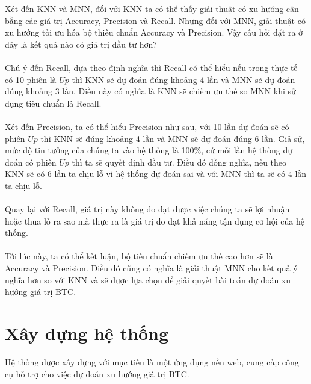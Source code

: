 Xét đến KNN và MNN, đối với KNN ta có thể thấy giải thuật có xu hướng cân bằng 
các giá trị Accuracy, Precision và Recall. Nhưng đối với MNN, giải thuật có xu 
hướng tối ưu hóa bộ thiêu chuẩn Accuracy và Precision. Vậy câu hỏi đặt ra ở đây 
là kết quả nào có giá trị đầu tư hơn?\\\\
Chú ý đến Recall, dựa theo định nghĩa thì Recall có thể hiểu nếu trong thực tế 
có 10 phiên là $Up$ thì KNN sẽ dự đoán đúng khoảng 4 lần và MNN sẽ dự đoán đúng 
khoảng 3 lần. Điều này có nghĩa là KNN sẽ chiếm ưu thế so MNN khi sử dụng tiêu 
chuẩn là Recall.\\\\
Xét đến Precision, ta có thể hiểu Precision như sau, với 10 lần dự đoán sẽ có 
phiên $Up$ thì KNN sẽ đúng khoảng 4 lần và MNN sẽ dự đoán đúng 6 lần. Giả sử, 
mức độ tin tưởng của chúng ta vào hệ thống là 100\%, cứ mỗi lần hệ thống dự 
đoán có phiên $Up$ thì ta sẽ quyết định đầu tư. Điều đó đồng nghĩa, nếu theo 
KNN sẽ có 6 lần ta chịu lỗ vì hệ thống dự đoán sai và với MNN thì ta sẽ có 4 
lần ta chịu lỗ.\\\\
Quay lại với Recall, giá trị này không đo đạt được việc chúng ta sẽ lợi nhuận 
hoặc thua lỗ ra sao mà thực ra là giá trị đo đạt khả năng tận dụng cơ hội của 
hệ thống.\\\\
Tới lúc này, ta có thể kết luận, bộ tiêu chuẩn chiếm ưu thế cao hơn sẽ là Accuracy 
và Precision. Điều đó cũng có nghĩa là giải thuật MNN cho kết quả ý nghĩa hơn so 
với KNN và sẽ được lựa chọn để giải quyết bài toán dự đoán xu hướng giá trị BTC.
\section{Xây dựng hệ thống}
Hệ thống được xây dựng với mục tiêu là một ứng dụng nền web, cung cấp công cụ hỗ 
trợ cho việc dự đoán xu hướng giá trị BTC.
